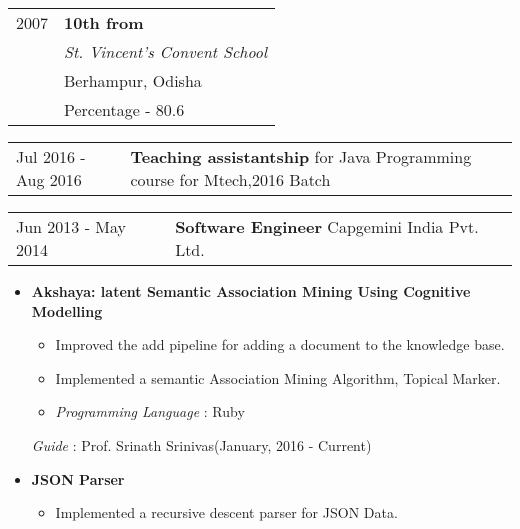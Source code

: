 \documentclass[10pt]{article}
\newcommand{\shadethis}[1]{ \begin{snugshade}#1\end{snugshade}}
\begin{document}
\begin{description}[style=nextline]
			\begin{tabular}{p{2cm}|p{10cm}}

			{2007} 	& \textbf{10th from} \\
			 	& \emph{St. Vincent's Convent School} \\
				& Berhampur, Odisha\\
				& {Percentage - 80.6}		
			\end{tabular}
			
		\shadethis{\item{}}
		\begin{tabular}{p{2cm}|p{10cm}}
			{ Jul 2016 - Aug 2016} & \textbf{Teaching assistantship} for Java Programming course for Mtech,2016 Batch
			  		
					  		
					
			\end{tabular}
			
			\begin{tabular}{p{2cm}|p{10cm}}
			{ Jun 2013 - May 2014} & \textbf{Software Engineer} Capgemini India Pvt. Ltd.
			  		
					
			\end{tabular}
		
		
		\shadethis{\item{}}
		
				
			\begin{itemize}
				
				\item \textbf{Akshaya: latent Semantic Association Mining Using Cognitive Modelling}
				\begin{itemize}
					\item Improved the add pipeline for adding a document to the knowledge base.
					\item Implemented a semantic Association Mining Algorithm, Topical Marker.
					\item \emph{Programming Language} :  Ruby
					
				\end{itemize}
				
				
				{\emph{Guide} : Prof. Srinath Srinivas}\hfill(January, 2016 - Current)
				
				\item \textbf{JSON Parser}
				\begin{itemize}
					\item Implemented a recursive descent parser for JSON Data.
					

\end{itemize}
\end{itemize}
\end{description}
\end{document}
